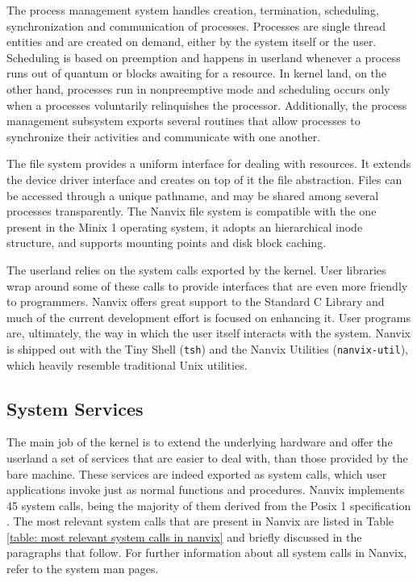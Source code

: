 \documentclass[10pt,a4paper]{article}
\begin{document}
The process management system handles creation, termination, scheduling, synchronization and communication of processes. Processes are single thread entities and are created on demand, either by the system itself or the user. Scheduling is based on preemption and happens in userland whenever a process runs out of quantum or blocks awaiting for a resource. In kernel land, on the other hand, processes run in nonpreemptive mode and scheduling occurs only when a processes voluntarily relinquishes the processor. Additionally, the process management subsystem exports several routines that allow processes to synchronize their activities and communicate with one another.

The file system provides a uniform interface for dealing with resources. It extends the device driver interface and creates on top of it the file abstraction. Files can be accessed through a unique pathname, and may be shared among several processes transparently. The Nanvix file system is compatible with the one present in the Minix 1 operating system, it adopts an hierarchical inode structure, and supports mounting points and disk block caching.

The userland relies on the system calls exported by the kernel. User libraries wrap around some of these calls to provide interfaces that are even more friendly to programmers. Nanvix offers great support to the Standard C Library and much of the current development effort is focused on enhancing it. User programs are, ultimately, the way in which the user itself interacts with the system. Nanvix is shipped out with the Tiny Shell (\texttt{tsh}) and the Nanvix Utilities (\texttt{nanvix-util}), which heavily resemble traditional Unix utilities. 

\subsection{System Services}
\label{section: system services}

The main job of the kernel is to extend the underlying hardware and offer the userland a set of services that are easier to deal with, than those provided by the bare machine. These services are indeed exported as system calls, which user applications invoke just as normal functions and procedures. Nanvix implements 45 system calls, being the majority of them derived from the Posix 1 specification \cite{IEEE:08}. The most relevant system calls that are present in Nanvix are listed in Table \ref{table: most relevant system calls in nanvix} and briefly discussed in the paragraphs that follow. For further information about all system calls in Nanvix, refer to the system man pages.
\end{document}
